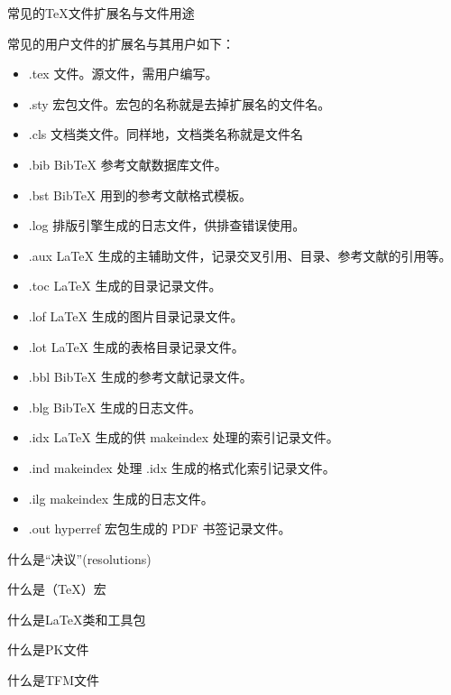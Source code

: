 \begin{faq}{常见的TeX文件扩展名与文件用途}

  常见的用户文件的扩展名与其用户如下：
  \begin{itemize}
    \item .tex 文件。源文件，需用户编写。
    \item .sty 宏包文件。宏包的名称就是去掉扩展名的文件名。
    \item .cls 文档类文件。同样地，文档类名称就是文件名
    \item .bib BibTeX 参考文献数据库文件。
    \item .bst BibTeX 用到的参考文献格式模板。
    \item .log 排版引擎生成的日志文件，供排查错误使用。
    \item .aux LaTeX 生成的主辅助文件，记录交叉引用、目录、参考文献的引用等。
    \item .toc LaTeX 生成的目录记录文件。
    \item .lof LaTeX 生成的图片目录记录文件。
    \item .lot LaTeX 生成的表格目录记录文件。
    \item .bbl BibTeX 生成的参考文献记录文件。
    \item .blg BibTeX 生成的日志文件。
    \item .idx LaTeX 生成的供 makeindex 处理的索引记录文件。
    \item .ind makeindex 处理 .idx 生成的格式化索引记录文件。
    \item .ilg makeindex 生成的日志文件。
    \item .out hyperref 宏包生成的 PDF 书签记录文件。
  \end{itemize}

\end{faq}

\begin{faq}{什么是“决议”(resolutions)}
\end{faq}

\begin{faq}{什么是（\TeX{}）宏}
\end{faq}

\begin{faq}{什么是\LaTeX{}类和工具包}
\end{faq}

\begin{faq}{什么是PK文件}
\end{faq}

\begin{faq}{什么是TFM文件}
\end{faq}

